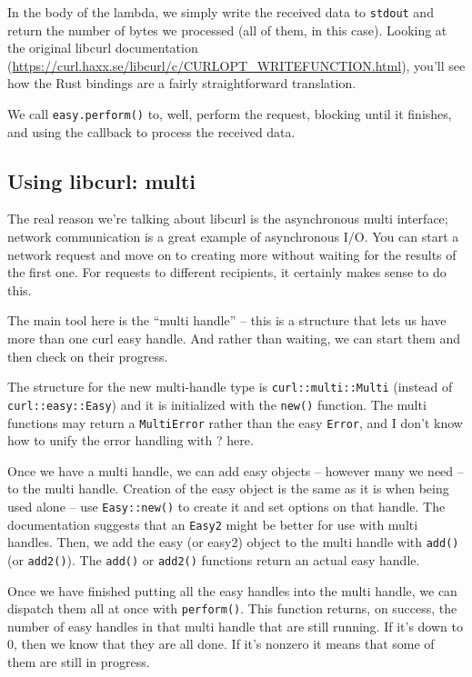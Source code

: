 In the body of the lambda, we simply write the received data to \texttt{stdout}
and return the number of bytes we processed (all of them, in this case).
Looking at the original libcurl documentation (\url{https://curl.haxx.se/libcurl/c/CURLOPT_WRITEFUNCTION.html}), you'll see how the Rust bindings
are a fairly straightforward translation.

We call \texttt{easy.perform()} to, well, perform the request, blocking until
it finishes, and using the callback to process the received data.

\subsection*{Using libcurl: multi}
The real reason we're talking about libcurl is the asynchronous multi interface;
network communication is a great example of asynchronous I/O.
You can start a network request and move on to creating more without waiting for the results of the first one. For requests to different recipients, it certainly makes sense to do this.

The main tool here is the ``multi handle'' -- this is a structure that lets us have more than one curl easy handle. And rather than waiting, we can start them and then check on their progress. 

The structure for the new multi-handle type is \texttt{curl::multi::Multi} (instead of \texttt{curl::easy::Easy}) and it is initialized with the \texttt{new()} function. The multi functions may return a \texttt{MultiError} rather than the easy \texttt{Error}, and I don't know how to unify the error handling with ? here.

Once we have a multi handle, we can add easy objects -- however many we need -- to the multi handle. Creation of the easy object is the same as it is when being used alone -- use \texttt{Easy::new()} to create it and set options on that handle. The documentation suggests that an \texttt{Easy2} might be better for use with multi handles. Then, we add the easy (or easy2) object to the multi handle with \texttt{add()} (or \texttt{add2()}). The \texttt{add()} or \texttt{add2()} functions return an actual easy handle.

Once we have finished putting all the easy handles into the multi handle, we can dispatch them all at once with \texttt{perform()}. This function returns, on success, the number of easy handles in that multi handle that are still running. If it's down to 0, then we know that they are all done. If it's nonzero it means that some of them are still in progress.

